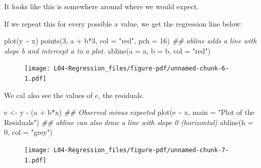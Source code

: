 \documentclass[
  letterpaper,
  DIV=11,
  numbers=noendperiod,
  oneside]{scrreprt}
\newenvironment{Shaded}{\begin{snugshade}}{\end{snugshade}}
\newcommand{\AttributeTok}[1]{\textcolor[rgb]{0.40,0.45,0.13}{#1}}
\newcommand{\DecValTok}[1]{\textcolor[rgb]{0.68,0.00,0.00}{#1}}
\newcommand{\DocumentationTok}[1]{\textcolor[rgb]{0.37,0.37,0.37}{\textit{#1}}}
\newcommand{\FunctionTok}[1]{\textcolor[rgb]{0.28,0.35,0.67}{#1}}
\newcommand{\NormalTok}[1]{\textcolor[rgb]{0.00,0.23,0.31}{#1}}
\newcommand{\OtherTok}[1]{\textcolor[rgb]{0.00,0.23,0.31}{#1}}
\newcommand{\SpecialCharTok}[1]{\textcolor[rgb]{0.37,0.37,0.37}{#1}}
\newcommand{\StringTok}[1]{\textcolor[rgb]{0.13,0.47,0.30}{#1}}
\begin{document}
It looks like this is somewhere around where we would expect.

If we repeat this for every possible \(x\) value, we get the regression
line below:

\begin{Shaded}
\begin{Highlighting}[]
\FunctionTok{plot}\NormalTok{(y }\SpecialCharTok{\textasciitilde{}}\NormalTok{ x)}
\FunctionTok{points}\NormalTok{(}\DecValTok{3}\NormalTok{, a }\SpecialCharTok{+}\NormalTok{ b}\SpecialCharTok{*}\DecValTok{3}\NormalTok{, }\AttributeTok{col =} \StringTok{"red"}\NormalTok{, }\AttributeTok{pch =} \DecValTok{16}\NormalTok{)}
\DocumentationTok{\#\# abline adds a line with slope b and intercept a to a plot.}
\FunctionTok{abline}\NormalTok{(}\AttributeTok{a =}\NormalTok{ a, }\AttributeTok{b =}\NormalTok{ b, }\AttributeTok{col =} \StringTok{"red"}\NormalTok{)}
\end{Highlighting}
\end{Shaded}

\begin{figure}[H]

{\centering \texttt{[image: L04-Regression\_files/figure-pdf/unnamed-chunk-6-1.pdf]}

}

\end{figure}

We cal also see the values of \(e\), the residuals.

\begin{Shaded}
\begin{Highlighting}[]
\NormalTok{e }\OtherTok{\textless{}{-}}\NormalTok{ y }\SpecialCharTok{{-}}\NormalTok{ (a }\SpecialCharTok{+}\NormalTok{ b}\SpecialCharTok{*}\NormalTok{x) }\DocumentationTok{\#\# Observed minus expected}
\FunctionTok{plot}\NormalTok{(e }\SpecialCharTok{\textasciitilde{}}\NormalTok{ x, }\AttributeTok{main =} \StringTok{"Plot of the Residuals"}\NormalTok{)}
\DocumentationTok{\#\# abline can also draw a line with slope 0 (horizontal)}
\FunctionTok{abline}\NormalTok{(}\AttributeTok{h =} \DecValTok{0}\NormalTok{, }\AttributeTok{col =} \StringTok{"grey"}\NormalTok{)}
\end{Highlighting}
\end{Shaded}

\begin{figure}[H]

{\centering \texttt{[image: L04-Regression\_files/figure-pdf/unnamed-chunk-7-1.pdf]}

}

\end{figure}
\end{document}
